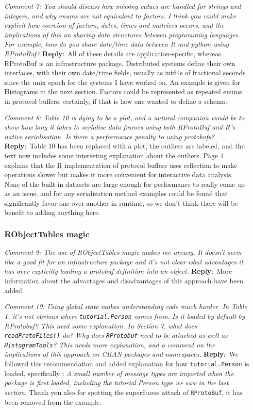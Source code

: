 \documentclass[10pt]{article}
\newcommand{\pointRaised}[2]{\smallskip %
  \textsl{{\fontseries{b}\selectfont #1}: #2}\newline}
\newcommand{\reply}[1]{\textbf{Reply}:\ #1 \smallskip } %
\begin{document}
\pointRaised{Comment 7}{You should discuss how missing values are handled for strings and
  integers, and why enums are not equivalent to factors. I think you
  could make explicit how coercion of factors, dates, times and matrices
  occurs, and the implications of this on sharing data structures
  between programming languages. For example, how do you share date/time
  data between R and python using RProtoBuf?}
\reply{All of these details are application-specific, whereas
  RProtoBuf is an infrastructure package.  Distributed systems define
  their own interfaces, with their own date/time fields, usually as
  int64s of fractional seconds since the unix epoch for the systems I
  have worked on.  An example is given for Histograms in the next
  section.  Factors could be represented as repeated enums in protocol
  buffers, certainly, if that is how one wanted to define a schema.}

\pointRaised{Comment 8}{Table 10 is dying to be a plot, and a natural companion would be to
  show how long it takes to serialise data frames using both RProtoBuf
  and R's native serialisation. Is there a performance penalty to using
  protobufs?}
\reply{Table 10 has been replaced with a plot, the outliers are
  labeled, and the text now includes some interesting explanation
  about the outliers.  Page 4 explains that the R implementation of
  protocol buffers uses reflection to make operations slower but makes
  it more convenient for interactive data analysis.  None of the
  built-in datasets are large enough for performance to really come up
  as an issue, and for any serialization method examples could be
  found that significantly favor one over another in runtime, so we
  don't think there will be benefit to adding anything here.  }

\subsubsection*{RObjectTables magic}

\pointRaised{Comment 9}{The use of RObjectTables magic makes me uneasy. It doesn't seem like a
  good fit for an infrastructure package and it's not clear what
  advantages it has over explicitly loading a protobuf definition into
  an object.}
\reply{More information about the advantages and disadvantages of this
  approach have been added.}

\pointRaised{Comment 10}{Using global state makes understanding code much harder. In Table 1,
  it's not obvious where \texttt{tutorial.Person} comes from. Is it loaded by
  default by RProtobuf? This need some explanation. In Section 7, what
  does \texttt{readProtoFiles()} do? Why does \texttt{RProtobuf} need to be attached
  as well as \texttt{HistogramTools}? This needs more explanation, and a
  comment on the implications of this approach on CRAN packages and
  namespaces.}
\reply{We followed this recommendation and added explanation for how
\texttt{tutorial.Person} is loaded, specifically : \emph{A small number of message types are imported when the
package is first loaded, including the tutorial.Person type we saw in
the last section.}  Thank you also for spotting the superfluous attach
of \texttt{RProtoBuf}, it has been removed from the example.}
\end{document}
